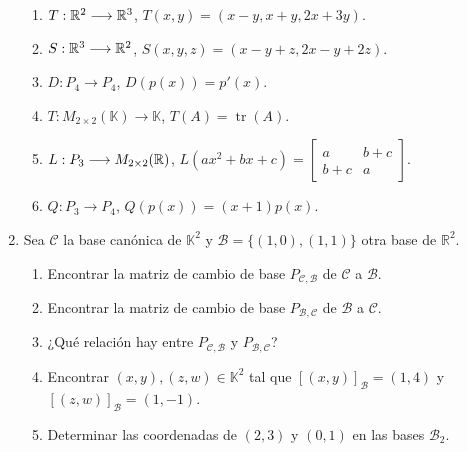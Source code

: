 \begin{enumerate}[topsep=6pt, itemsep=.4cm]
\begin{enumerate}
    \item\label{lineales1-bases-a} $T:\mathbb R^2 \longrightarrow \mathbb R^3$, $T(x,y)=(x-y,x+y,2x+3y)$.
    \item\label{lineales1-bases-b} $S:\mathbb R^3 \longrightarrow \mathbb R^2$, $S(x,y,z)=(x-y+z,2x-y+2z)$.
    \item\label{lineales1-base-c} $D:P_4  \longrightarrow P_4$, $D(p(x))=p'(x)$.
    \item $T:M_{2\times 2}(\mathbb{K}) \longrightarrow \mathbb{K}$, $T(A)=\operatorname{tr}(A)$.
    \item\label{lineales1-base-d} $L:P_3 \longrightarrow M_{2\times 2}(\mathbb R)$, $L(ax^2+bx+c)=\begin{bmatrix} a & b+c \\ b+c & a \end{bmatrix}$.
    \item\label{lineales1-base-e} $Q:P_3 \longrightarrow P_4$, $Q(p(x))=(x+1)p(x)$.
\end{enumerate}

\item\label{otras bases} Sea $\mathcal{C}$ la base canónica de $\mathbb{K}^2$ y 
    $\mathcal{B}=\{(1,0),(1,1)\}$ otra base de $\mathbb{R}^2$.
    \begin{enumerate}
        \item\label{otras bases-a} Encontrar la matriz de cambio de base $P_{\mathcal{C},\mathcal{B}}$ de $\mathcal{C}$ a $\mathcal{B}$.
        \item\label{otras bases-b} Encontrar la matriz de cambio de base $P_{\mathcal{B},\mathcal{C}}$ de $\mathcal{B}$ a $\mathcal{C}$.
        \item\label{otras bases-c} ¿Qué relación hay entre $P_{\mathcal{C},\mathcal{B}}$ y $P_{\mathcal{B},\mathcal{C}}$?
        \item\label{otras bases-d} Encontrar $(x,y),(z,w)\in\mathbb{K}^2$ tal que $[(x,y)]_{\mathcal{B}}=(1,4)$ y $[(z,w)]_{\mathcal{B}}=(1,-1)$.
        \item\label{otras bases-e} Determinar las coordenadas de $(2,3)$ y $(0,1)$ en las bases $\mathcal{B}_2$.
    \end{enumerate}
    


\end{enumerate}
